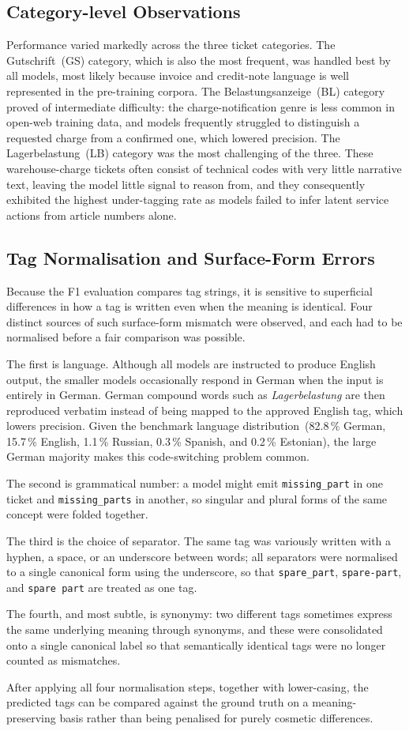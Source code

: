 \subsection{Category-level Observations}
%
Performance varied markedly across the three ticket categories.  The
Gutschrift~(GS) category, which is also the most frequent, was handled best by
all models, most likely because invoice and credit-note language is well
represented in the pre-training corpora.  The Belastungsanzeige~(BL) category
proved of intermediate difficulty: the charge-notification genre is less common
in open-web training data, and models frequently struggled to distinguish a
requested charge from a confirmed one, which lowered precision.  The
Lagerbelastung~(LB) category was the most challenging of the three.  These
warehouse-charge tickets often consist of technical codes with very little
narrative text, leaving the model little signal to reason from, and they
consequently exhibited the highest under-tagging rate as models failed to
infer latent service actions from article numbers alone.

\subsection{Tag Normalisation and Surface-Form Errors}
\label{sec:results-language}
%
Because the F1 evaluation compares tag strings, it is sensitive to superficial
differences in how a tag is written even when the meaning is identical.  Four
distinct sources of such surface-form mismatch were observed, and each had to
be normalised before a fair comparison was possible.

The first is language.  Although all models are instructed to produce English
output, the smaller models occasionally respond in German when the input is
entirely in German.  German compound words such as \textit{Lagerbelastung} are
then reproduced verbatim instead of being mapped to the approved English tag,
which lowers precision.  Given the benchmark language
distribution~(82.8\,\% German, 15.7\,\% English, 1.1\,\% Russian, 0.3\,\%
Spanish, and 0.2\,\% Estonian), the large German majority makes this
code-switching problem common.

The second is grammatical number: a model might emit \texttt{missing\_part} in
one ticket and \texttt{missing\_parts} in another, so singular and plural forms
of the same concept were folded together.

The third is the choice of separator.  The same tag was variously written with
a hyphen, a space, or an underscore between words; all separators were
normalised to a single canonical form using the underscore, so that
\texttt{spare\_part}, \texttt{spare-part}, and \texttt{spare part} are treated
as one tag.

The fourth, and most subtle, is synonymy: two different tags sometimes express
the same underlying meaning through synonyms, and these were consolidated onto
a single canonical label so that semantically identical tags were no longer
counted as mismatches.

After applying all four normalisation steps, together with lower-casing, the
predicted tags can be compared against the ground truth on a meaning-preserving
basis rather than being penalised for purely cosmetic differences.
